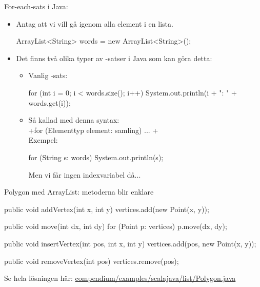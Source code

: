 \begin{Slide}{For-each-sats i Java:}\SlideFontSmall
\begin{itemize}
\item  Antag att vi vill gå igenom alla element i en lista.
\begin{Code}[numberstyle=,language=Java]
        ArrayList<String> words = new ArrayList<String>();
\end{Code}
\item Det finns två olika typer av -satser i Java som kan göra detta:
\begin{itemize}\footnotesize
\item[]  Vanlig -sats:
\begin{Code}[numberstyle=,language=Java]
for (int i = 0; i < words.size(); i++) {
    System.out.println(i + ": " + words.get(i));
}
\end{Code}

\item[]  Så kallad  med denna syntax:\\
\jcode+for (Elementtyp element: samling) { ... }+ \\
\vspace{1em}Exempel:
\begin{Code}[numberstyle=,language=Java]
for (String s: words) {
    System.out.println(s);
}
\end{Code}
Men vi får ingen indexvariabel då...
\end{itemize}
\end{itemize}
\end{Slide}


\begin{Slide}{Polygon med ArrayList: metoderna blir enklare}
\begin{Code}[numberstyle=,language=Java]
    public void addVertex(int x, int y) {
        vertices.add(new Point(x, y));
    }

    public void move(int dx, int dy) {
        for (Point p: vertices){
            p.move(dx, dy);
        }
    }

    public void insertVertex(int pos, int x, int y) {
        vertices.add(pos, new Point(x, y));
    }

    public void removeVertex(int pos) {
        vertices.remove(pos);
    }
\end{Code}

Se hela lösningen här:
\href{https://github.com/lunduniversity/introprog/tree/master/compendium/examples/scalajava/list/Polygon.java}{compendium/examples/scalajava/list/Polygon.java}
\end{Slide}

